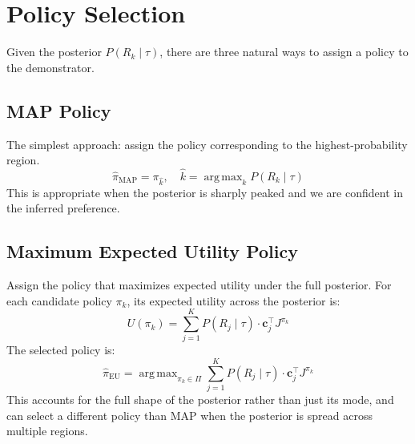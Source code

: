 \documentclass[11pt]{article}
\DeclareMathOperator*{\argmax}{arg\,max}
\begin{document}
\newpage

\section{Policy Selection}
\label{sec:policy_selection}


Given the posterior $P(R_k \mid \tau)$, there are three natural ways to assign a policy to the demonstrator.
 
\subsection{MAP Policy}
 
The simplest approach: assign the policy corresponding to the highest-probability region.
\begin{equation}
    \hat{\pi}_{\text{MAP}} = \pi_{\hat{k}}, \quad \hat{k} = \argmax_k P(R_k \mid \tau)
\end{equation}
This is appropriate when the posterior is sharply peaked and we are confident in the inferred preference.
 
\subsection{Maximum Expected Utility Policy}
 
Assign the policy that maximizes expected utility under the full posterior. For each candidate policy $\pi_k$, its expected utility across the posterior is:
\begin{equation}
    U(\pi_k) = \sum_{j=1}^{K} P(R_j \mid \tau) \cdot \mathbf{c}_j^\top J^{\pi_k}
\end{equation}
The selected policy is:
\begin{equation}
    \hat{\pi}_{\text{EU}} = \argmax_{\pi_k \in \Pi} \sum_{j=1}^{K} P(R_j \mid \tau) \cdot \mathbf{c}_j^\top J^{\pi_k}
\end{equation}
This accounts for the full shape of the posterior rather than just its mode, and can select a different policy than MAP when the posterior is spread across multiple regions.
 
\end{document}
